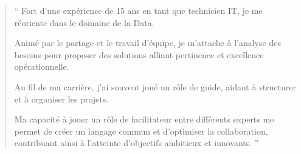 \documentclass[10pt,a4paper,ragged2e,withhyper,normalphoto]{altacv}
\begin{document}


\makecvheader


\begin{quote}
``
Fort d'une expérience de 15 ans en tant que technicien IT, je me réoriente dans le domaine de la Data.

Animé par le partage et le travail d’équipe, je m’attache à l'analyse des besoins pour proposer des solutions alliant pertinence et excellence opérationnelle.

\medskip

Au fil de ma carrière, j’ai souvent joué un rôle de guide, aidant à structurer et à organiser les projets. 

Ma capacité à jouer un rôle de facilitateur entre différents experts me permet de créer un langage commun et d'optimiser la collaboration, contribuant ainsi à l'atteinte d'objectifs ambitieux et innovants.
''
\end{quote}

\bigskip

\end{document}
